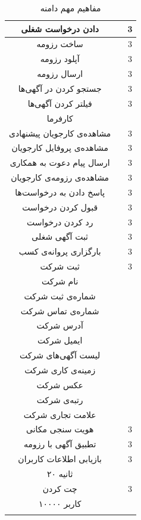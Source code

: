 \begin{longtable}{|c|c|c|}
	\hline
	دادن درخواست شغلی &
	\asje &
	3 \\
	\hline
	ساخت رزومه &
	\asjs &
	3 \\
	\hline
	آپلود رزومه &
	\asjs &
	3 \\
	\hline
	ارسال رزومه &
	\asje &
	3 \\
	\hline
	جستجو کردن در آگهی‌ها &
	\asus &
	3 \\
	\hline
	فیلتر کردن آگهی‌ها &
	\asus &
	3 \\
	\hline
	کارفرما &
	\myc &
	\oned \\
	\hline
	مشاهده‌ی کارجویان پیشنهادی &
	\ases &
	3 \\
	\hline
	مشاهده‌ی پروفایل کارجویان &
	\asus &
	3 \\
	\hline
	ارسال پیام دعوت به همکاری &
	\asej &
	3 \\
	\hline
	مشاهده‌ی رزومه‌ی کارجویان &
	\asus &
	3 \\
	\hline
	پاسخ دادن به درخواست‌ها &
	\aser &
	3 \\
	\hline
	قبول کردن درخواست &
	\aser &
	3 \\
	\hline
	رد کردن درخواست &
	\aser &
	3 \\
	\hline
	ثبت آگهی‌ شغلی &
	\ases &
	3 \\
	\hline
	بارگزاری پروانه‌ی کسب &
	\ases &
	3 \\
	\hline
	ثبت شرکت & 
	\ases & 
	3 \\
	\hline
	نام شرکت & 
	\mya & 
	\oneh \\
	\hline
	شماره‌ی ثبت شرکت & 
	\mya & 
	\oneh \\
	\hline
	شماره‌ی تماس شرکت & 
	\mya & 
	\oneh \\
	\hline
	آدرس شرکت & 
	\mya & 
	\oneh \\
	\hline
	ایمیل شرکت & 
	\mya & 
	\oneh \\
	\hline
	لیست آگهی‌های شرکت & 
	\mya & 
	\oneh \\
	\hline
	زمینه‌ی کاری شرکت & 
	\mya & 
	\oneh \\
	\hline
	عکس شرکت & 
	\mya & 
	\oneh \\
	\hline
	رتبه‌ی شرکت & 
	\mya & 
	\oneh \\
	\hline
	علامت تجاری شرکت & 
	\mya & 
	\oneh \\
	\hline
	هویت سنجی مکانی & 
	\asse & 
	3 \\
	\hline
	تطبیق آگهی با رزومه & 
	\assj & 
	3 \\
	\hline
	بازیابی اطلاعات کاربران & 
	\assu & 
	3 \\
	\hline
	۲۰ ثانیه & 
	\myv & 
	\fiveb \\
	\hline
	چت کردن & 
	\asje & 
	3 \\
	\hline
	۱۰۰۰۰ کاربر & 
	\myv & 
	\fiveb \\
	\hline
	\caption{مفاهیم مهم دامنه}\label{table:domain}
\end{longtable}

